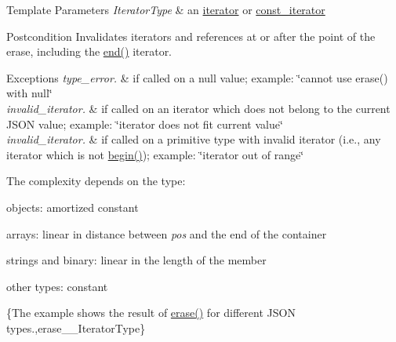 \begin{DoxyTemplParams}{Template Parameters}
{\em Iterator\+Type} & an \hyperlink{classnlohmann_1_1basic__json_aa549b2b382916b3baafb526e5cb410bd}{iterator} or \hyperlink{classnlohmann_1_1basic__json_aebd2cfa7e4ded4e97cde9269bfeeea38}{const\+\_\+iterator}\\
\hline
\end{DoxyTemplParams}
\begin{DoxyPostcond}{Postcondition}
Invalidates iterators and references at or after the point of the erase, including the {\ttfamily \hyperlink{classnlohmann_1_1basic__json_a931267ec3f09eb67e4382f321b2c52bc}{end()}} iterator.
\end{DoxyPostcond}

\begin{DoxyExceptions}{Exceptions}
{\em type\+\_\+error.} & if called on a {\ttfamily null} value; example\+: {\ttfamily \char`\"{}cannot use
erase() with null\char`\"{}} \\
\hline
{\em invalid\+\_\+iterator.} & if called on an iterator which does not belong to the current J\+S\+ON value; example\+: {\ttfamily \char`\"{}iterator does not fit current
value\char`\"{}} \\
\hline
{\em invalid\+\_\+iterator.} & if called on a primitive type with invalid iterator (i.\+e., any iterator which is not {\ttfamily \hyperlink{classnlohmann_1_1basic__json_a23b495b4c282e4afacf382f5b49af7c7}{begin()}}); example\+: {\ttfamily \char`\"{}iterator
out of range\char`\"{}}\\
\hline
\end{DoxyExceptions}
The complexity depends on the type\+:
\begin{DoxyItemize}
\item objects\+: amortized constant
\item arrays\+: linear in distance between {\itshape pos} and the end of the container
\item strings and binary\+: linear in the length of the member
\item other types\+: constant
\end{DoxyItemize}

\{The example shows the result of {\ttfamily \hyperlink{classnlohmann_1_1basic__json_a494632b69bbe1d0153d3bedad0901b8e}{erase()}} for different J\+S\+ON types.,erase\+\_\+\+\_\+\+Iterator\+Type\}

